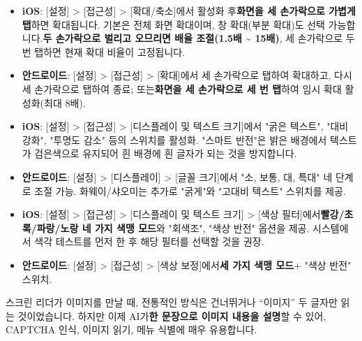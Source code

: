 

\begin{itemize}
  \item \textbf{iOS}: [설정] > [접근성] > [확대/축소]에서 활성화 후\textbf{화면을 세 손가락으로 가볍게 탭}하면 확대됩니다. 기본은 전체 화면 확대이며, 창 확대(부분 확대)도 선택 가능합니다.\textbf{두 손가락으로 벌리고 오므리면 배율 조절(1.5배 \textasciitilde{} 15배)}, 세 손가락으로 두 번 탭하면 현재 확대 비율이 고정됩니다.
  \item \textbf{안드로이드}: [설정] > [접근성] > [확대]에서 세 손가락으로 탭하여 확대하고, 다시 세 손가락으로 탭하여 종료; 또는\textbf{화면을 세 손가락으로 세 번 탭}하여 임시 확대 활성화(최대 8배).
\end{itemize}


\begin{itemize}
  \item \textbf{iOS}: [설정] > [접근성] > [디스플레이 및 텍스트 크기]에서 "굵은 텍스트", "대비 강화", "투명도 감소" 등의 스위치를 활성화. "스마트 반전"은 밝은 배경에서 텍스트가 검은색으로 유지되어 흰 배경에 흰 글자가 되는 것을 방지합니다.
  \item \textbf{안드로이드}: [설정] > [디스플레이] > [글꼴 크기]에서 "소, 보통, 대, 특대" 네 단계로 조절 가능. 화웨이/샤오미는 추가로 "굵게"와 "고대비 텍스트" 스위치를 제공.
\end{itemize}


\begin{itemize}
  \item \textbf{iOS}: [설정] > [접근성] > [디스플레이 및 텍스트 크기] > [색상 필터]에서\textbf{빨강/초록/파랑/노랑 네 가지 색맹 모드}와 "회색조", "색상 반전" 옵션을 제공. 시스템에서 색각 테스트를 먼저 한 후 해당 필터를 선택할 것을 권장.
  \item \textbf{안드로이드}: [설정] > [접근성] > [색상 보정]에서\textbf{세 가지 색맹 모드}+ "색상 반전" 스위치.
\end{itemize}


스크린 리더가 이미지를 만날 때, 전통적인 방식은 건너뛰거나 “이미지” 두 글자만 읽는 것이었습니다. 하지만 이제 AI가\textbf{한 문장으로 이미지 내용을 설명}할 수 있어, CAPTCHA 인식, 이미지 읽기, 메뉴 식별에 매우 유용합니다.

